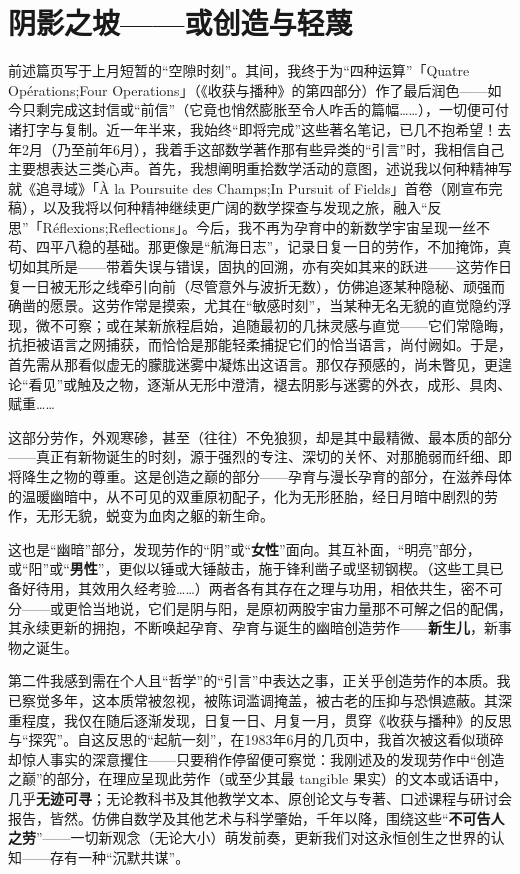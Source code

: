 \section{阴影之坡——或创造与轻蔑}

前述篇页写于上月短暂的“空隙时刻”。其间，我终于为“四种运算”「Quatre Opérations;Four Operations」（《收获与播种》的第四部分）作了最后润色——如今只剩完成这封信或“前信”（它竟也悄然膨胀至令人咋舌的篇幅……），一切便可付诸打字与复制。近一年半来，我始终“即将完成”这些著名笔记，已几不抱希望！去年2月（乃至前年6月），我着手这部数学著作那有些异类的“引言”时，我相信自己主要想表达三类心声。首先，我想阐明重拾数学活动的意图，述说我以何种精神写就《追寻域》「À la Poursuite des Champs;In Pursuit of Fields」首卷（刚宣布完稿），以及我将以何种精神继续更广阔的数学探查与发现之旅，融入“反思”「Réflexions;Reflections」。今后，我不再为孕育中的新数学宇宙呈现一丝不苟、四平八稳的基础。那更像是“航海日志”，记录日复一日的劳作，不加掩饰，真切如其所是——带着失误与错误，固执的回溯，亦有突如其来的跃进——这劳作日复一日被无形之线牵引向前（尽管意外与波折无数），仿佛追逐某种隐秘、顽强而确凿的愿景。这劳作常是摸索，尤其在“敏感时刻”，当某种无名无貌的直觉隐约浮现，微不可察；或在某新旅程启始，追随最初的几抹灵感与直觉——它们常隐晦，抗拒被语言之网捕获，而恰恰是那能轻柔捕捉它们的恰当语言，尚付阙如。于是，首先需从那看似虚无的朦胧迷雾中凝炼出这语言。那仅存预感的，尚未瞥见，更遑论“看见”或触及之物，逐渐从无形中澄清，褪去阴影与迷雾的外衣，成形、具肉、赋重……

这部分劳作，外观寒碜，甚至（往往）不免狼狈，却是其中最精微、最本质的部分——真正有新物诞生的时刻，源于强烈的专注、深切的关怀、对那脆弱而纤细、即将降生之物的尊重。这是创造之巅的部分——孕育与漫长孕育的部分，在滋养母体的温暖幽暗中，从不可见的双重原初配子，化为无形胚胎，经日月暗中剧烈的劳作，无形无貌，蜕变为血肉之躯的新生命。

这也是“幽暗”部分，发现劳作的“阴”或“\textbf{女性}”面向。其互补面，“明亮”部分，或“阳”或“\textbf{男性}”，更似以锤或大锤敲击，施于锋利凿子或坚韧钢楔。（这些工具已备好待用，其效用久经考验……）两者各有其存在之理与功用，相依共生，密不可分——或更恰当地说，它们是阴与阳，是原初两股宇宙力量那不可解之侣的配偶，其永续更新的拥抱，不断唤起孕育、孕育与诞生的幽暗创造劳作——\textbf{新生儿}，新事物之诞生。

第二件我感到需在个人且“哲学”的“引言”中表达之事，正关乎创造劳作的本质。我已察觉多年，这本质常被忽视，被陈词滥调掩盖，被古老的压抑与恐惧遮蔽。其深重程度，我仅在随后逐渐发现，日复一日、月复一月，贯穿《收获与播种》的反思与“探究”。自这反思的“起航一刻”，在1983年6月的几页中，我首次被这看似琐碎却惊人事实的深意攫住——只要稍作停留便可察觉：我刚述及的发现劳作中“创造之巅”的部分，在理应呈现此劳作（或至少其最 tangible 果实）的文本或话语中，几乎\textbf{无迹可寻}；无论教科书及其他教学文本、原创论文与专著、口述课程与研讨会报告，皆然。仿佛自数学及其他艺术与科学肇始，千年以降，围绕这些“\textbf{不可告人之劳}”——一切新观念（无论大小）萌发前奏，更新我们对这永恒创生之世界的认知——存有一种“沉默共谋”。

